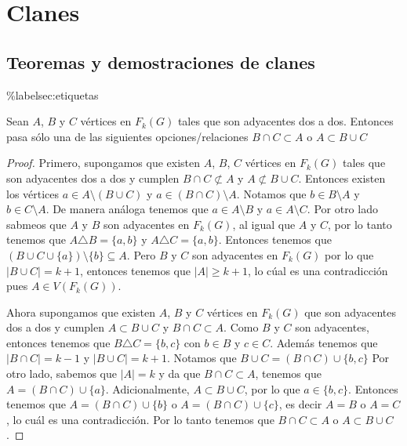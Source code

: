 \chapter{Clanes}%
\label{cap:clanes}

\section{Teoremas y demostraciones de clanes}%
\%label{sec:etiquetas}


\begin{lema}%
        \label{lem:adyacencia de tres vertices}
        Sean $A$, $B$ y $C$ v\'ertices en $F_k(G)$ tales que son adyacentes
        dos a dos. Entonces pasa s\'olo una de las siguientes
        opciones/relaciones $B \cap C \subset A$ o $A \subset B \cup C$
        \end{lema}

    
    \begin{proof}
        Primero, supongamos que existen $A$, $B$, $C$ v\'ertices en $F_k(G)$
        tales que son adyacentes dos a dos y cumplen $B \cap C \not\subset A$ y
        $A \not\subset B \cup C$. Entonces existen los v\'ertices  $a \in A
        \setminus (B \cup C)$ y $a \in (B \cap C)\setminus A$. Notamos que $b
        \in B \setminus A$ y $b \in C \setminus A$. De manera an\'aloga tenemos
        que $a \in A \setminus B$ y $a \in A \setminus C$. Por otro lado sabmeos
        que $A$ y $B$ son adyacentes en $F_k(G)$, al igual que $A$ y $C$, por lo
        tanto tenemos que $A \triangle B = \{a,b\}$ y $A \triangle C = \{a,
        b\}$. Entonces tenemos que $(B \cup C \cup \{a\})\setminus \{b\}
        \subseteq A$. Pero $B$ y $C$ son adyacentes en $F_k(G)$ por lo que $|B
        \cup C| = k+1$, entonces tenemos que $|A| \geq k+1$, lo c\'ual es una
        contradicci\'on pues $A \in V (F_k(G))$. 

        Ahora supongamos que existen $A$, $B$ y $C$ v\'ertices en $F_k(G)$ que
        son adyacentes dos a dos y cumplen $A \subset B \cup C$ y $B \cap C
        \subset A$. Como $B$ y $C$ son adyacentes, entonces tenemos que $B
        \triangle C = \{b,c\}$ con $b \in B$ y $c \in C$. Adem\'as tenemos que
        $|B \cap C| = k-1$ y $|B \cup C| = k +1$. Notamos que $B \cup C = (B\cap
        C) \cup \{b,c\}$ Por otro lado, sabemos que $|A|=k$ y da que $B \cap C
        \subset A$, tenemos que $A = (B \cap C) \cup \{a\}$. Adicionalmente, $A
        \subset B \cup C$, por lo que $a \in \{b, c\}$. Entonces tenemos que $A
        = (B \cap C) \cup \{b\}$ o $A = (B \cap C) \cup \{c\}$, es decir $A = B$
        o $A=C$, lo cu\'al es una contradicci\'on. Por lo tanto tenemos que $B
        \cap C \subset A$ o $A \subset B \cup C$.
    \end{proof}

